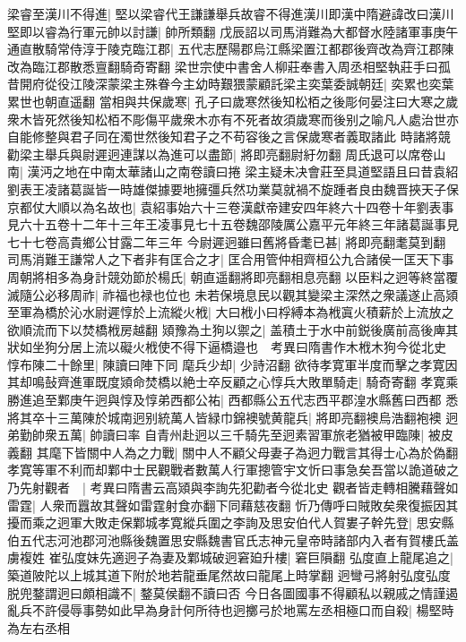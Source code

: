 梁睿至漢川不得進|{
	堅以梁睿代王謙謙舉兵故睿不得進漢川即漢中隋避諱改曰漢川}
堅即以睿為行軍元帥以討謙|{
	帥所類翻}
戊辰詔以司馬消難為大都督水陸諸軍事庚午通直散騎常侍淳于陵克臨江郡|{
	五代志歷陽郡烏江縣梁置江都郡後齊改為齊江郡陳改為臨江郡散悉亶翻騎奇寄翻}
梁世宗使中書舍人柳莊奉書入周丞相堅執莊手曰孤昔開府從役江陵深蒙梁主殊眷今主幼時艱猥蒙顧託梁主奕葉委誠朝廷|{
	奕累也奕葉累世也朝直遥翻}
當相與共保歲寒|{
	孔子曰歲寒然後知松栢之後彫何晏注曰大寒之歲衆木皆死然後知松栢不彫傷平歲衆木亦有不死者故須歲寒而後别之喻凡人處治世亦自能修整與君子同在濁世然後知君子之不苟容後之言保歲寒者義取諸此}
時諸將競勸梁主舉兵與尉遲迥連謀以為進可以盡節|{
	將即亮翻尉紆勿翻}
周氏退可以席卷山南|{
	漢沔之地在中南太華諸山之南卷讀曰捲}
梁主疑未决會莊至具道堅語且曰昔袁紹劉表王凌諸葛誕皆一時雄傑據要地擁彊兵然功業莫就禍不旋踵者良由魏晋挾天子保京都仗大順以為名故也|{
	袁紹事始六十三卷漢獻帝建安四年終六十四卷十年劉表事見六十五卷十二年十三年王凌事見七十五卷魏邵陵厲公嘉平元年終三年諸葛誕事見七十七卷高貴鄉公甘露二年三年}
今尉遲迥雖曰舊將昏耄已甚|{
	將即亮翻耄莫到翻}
司馬消難王謙常人之下者非有匡合之才|{
	匡合用管仲相齊桓公九合諸侯一匡天下事}
周朝將相多為身計競効節於楊氏|{
	朝直遥翻將即亮翻相息亮翻}
以臣料之迥等終當覆滅隨公必移周祚|{
	祚福也禄也位也}
未若保境息民以觀其變梁主深然之衆議遂止高熲至軍為橋於沁水尉遲惇於上流縱火栰|{
	大曰栰小曰桴縛本為栰寘火積薪於上流放之欲順流而下以焚橋栰房越翻}
熲豫為土狗以禦之|{
	盖積土于水中前鋭後廣前高後庳其狀如坐狗分居上流以礙火栰使不得下逼橋邉也　考異曰隋書作木栰木狗今從北史}
惇布陳二十餘里|{
	陳讀曰陣下同}
麾兵少却|{
	少詩沼翻}
欲待孝寛軍半度而擊之孝寛因其却鳴鼔齊進軍既度熲命焚橋以絶士卒反顧之心惇兵大敗單騎走|{
	騎奇寄翻}
孝寛乘勝進追至鄴庚午迥與惇及惇弟西都公祐|{
	西都縣公五代志西平郡湟水縣舊曰西都}
悉將其卒十三萬陳於城南迥别統萬人皆緑巾錦襖號黄龍兵|{
	將即亮翻襖烏浩翻袍襖}
迥弟勤帥衆五萬|{
	帥讀曰率}
自青州赴迥以三千騎先至迥素習軍旅老猶被甲臨陳|{
	被皮義翻}
其麾下皆關中人為之力戰|{
	關中人不顧父母妻子為迥力戰言其得士心為於偽翻}
孝寛等軍不利而却鄴中士民觀戰者數萬人行軍摠管宇文忻曰事急矣吾當以詭道破之乃先射觀者　|{
	考異曰隋書云高熲與李詢先犯勸者今從北史}
觀者皆走轉相騰藉聲如雷霆|{
	人衆而囂故其聲如雷霆射食亦翻下同藉慈夜翻}
忻乃傳呼曰賊敗矣衆復振因其擾而乘之迥軍大敗走保鄴城孝寛縱兵圍之李詢及思安伯代人賀婁子幹先登|{
	思安縣伯五代志河池郡河池縣後魏置思安縣魏書官氏志神元皇帝時諸部内入者有賀樓氏盖虜複姓}
崔弘度妹先適迥子為妻及鄴城破迥窘廹升樓|{
	窘巨隕翻}
弘度直上龍尾追之|{
	築道陂陀以上城其道下附於地若龍垂尾然故曰龍尾上時掌翻}
迥彎弓將射弘度弘度脱兜鍪謂迥曰頗相識不|{
	鍪莫侯翻不讀曰否}
今日各圖國事不得顧私以親戚之情謹遏亂兵不許侵辱事勢如此早為身計何所待也迥擲弓於地罵左丞相極口而自殺|{
	楊堅時為左右丞相}
